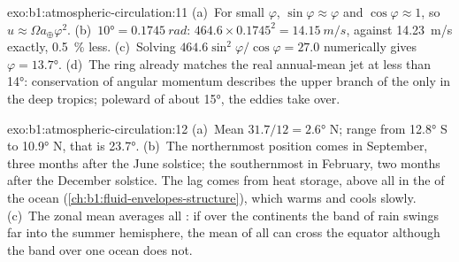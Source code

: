 \begin{solution}{exo:b1:atmospheric-circulation:11}
(a)~For small $\varphi$, $\sin\varphi \approx \varphi$ and $\cos\varphi \approx 1$,
so $u \approx \Omega a_\oplus\varphi^2$. (b)~$\ang{10} = \qty{0.1745}{rad}$:
$464.6 \times 0.1745^2 = \qty{14.15}{m/s}$, against \qty{14.23}{m/s} exactly,
\qty{0.5}{\percent} less. (c)~Solving $464.6\sin^2\varphi/\cos\varphi = 27.0$
numerically gives $\varphi = \ang{13.7}$. (d)~The ring already matches the real
annual-mean jet at less than \ang{14}: conservation of angular momentum describes the
upper branch of the  only in the deep tropics; poleward of about
\ang{15}, the eddies take over.
\end{solution}

\begin{solution}{exo:b1:atmospheric-circulation:12}
(a)~Mean $31.7/12 = \ang{2.6}$ N; range from \ang{12.8} S to \ang{10.9} N, that is
\ang{23.7}. (b)~The northernmost position comes in September, three months after the
June solstice; the southernmost in February, two months after the December solstice.
The lag comes from heat storage, above all in the  of the ocean
(\cref{ch:b1:fluid-envelopes-structure}), which warms and cools slowly. (c)~The zonal
mean averages all : if over the continents the band of rain swings far
into the summer hemisphere, the mean of all  can cross the equator
although the band over one ocean does not.
\end{solution}

